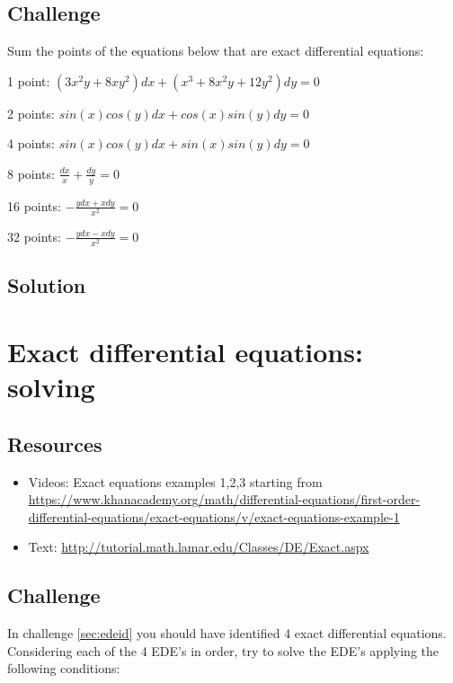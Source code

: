\subsection*{Challenge}
Sum the points of the equations below that are exact differential equations:

1 point: $\displaystyle (3x^2y+8xy^2) dx + (x^3 + 8x^2y + 12 y^2) dy = 0$ %

2 points: $\displaystyle sin(x) cos(y) dx + cos(x) sin(y) dy = 0$ %

4 points: $\displaystyle sin(x) cos(y) dx + sin(x) sin(y) dy = 0$ %

8 points: $\displaystyle \frac{dx}{x} + \frac{dy}{y} = 0$ %

16 points: $\displaystyle -\frac{y dx + x dy}{x^2} = 0 $ %

32 points: $\displaystyle -\frac{y dx - x dy}{x^2} = 0$ %


\subsection*{Solution}
\six{}


\timebox



\newpage
\section{Exact differential equations: solving}

\subsection*{Resources}
\begin{itemize}
    \item Videos: Exact equations examples 1,2,3 starting from \url{https://www.khanacademy.org/math/differential-equations/first-order-differential-equations/exact-equations/v/exact-equations-example-1}
    \item Text: \url{http://tutorial.math.lamar.edu/Classes/DE/Exact.aspx}
\end{itemize}

\subsection*{Challenge}
In challenge \ref{sec:edeid} you should have identified 4 exact differential equations. Considering each of the 4 EDE's in order, try to solve the EDE's applying the following conditions:

